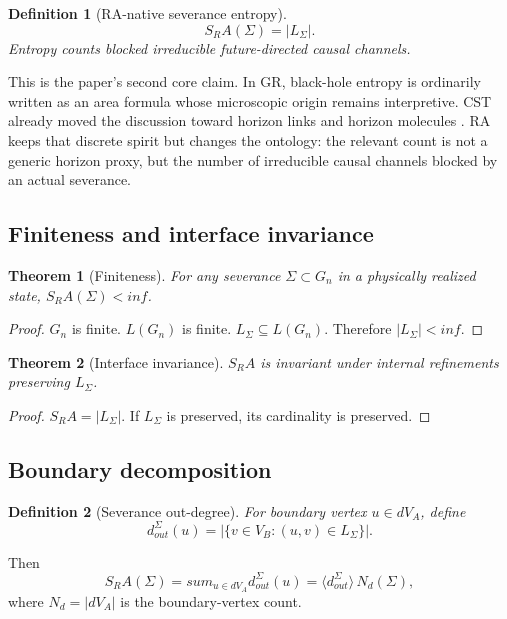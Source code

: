 \documentclass[11pt]{article}
\def\mathrm#1{#1}%
\def\infty{inf}%
\def\sum{sum}%
\def\partial{d}%
\def\SRa{S_RA}%
\newtheorem{definition}{Definition}
\newtheorem{theorem}{Theorem}
\newcommand{\SRa}{\ensuremath{S_{\mathrm{RA}}}}
\begin{document}
\begin{definition}[RA-native severance entropy]
\[
\boxed{\SRa(\Sigma)=|L_\Sigma|.}
\]
Entropy counts blocked irreducible future-directed causal channels.
\end{definition}

This is the paper's second core claim. In GR, black-hole entropy is ordinarily written as an area formula whose microscopic origin remains interpretive. CST already moved the discussion toward horizon links and horizon molecules \cite{Dou2003,Barton2019,Homsak2024}. RA keeps that discrete spirit but changes the ontology: the relevant count is not a generic horizon proxy, but the number of irreducible causal channels blocked by an actual severance.

\subsection{Finiteness and interface invariance}

\begin{theorem}[Finiteness]
For any severance $\Sigma\subset G_n$ in a physically realized state, $\SRa(\Sigma)<\infty$.
\end{theorem}
\begin{proof}
$G_n$ is finite. $L(G_n)$ is finite. $L_\Sigma\subseteq L(G_n)$. Therefore $|L_\Sigma|<\infty$.
\end{proof}

\begin{theorem}[Interface invariance]
$\SRa$ is invariant under internal refinements preserving $L_\Sigma$.
\end{theorem}
\begin{proof}
$\SRa=|L_\Sigma|$. If $L_\Sigma$ is preserved, its cardinality is preserved.
\end{proof}

\subsection{Boundary decomposition}

\begin{definition}[Severance out-degree]
For boundary vertex $u\in\partial V_A$, define
\[
d_{\mathrm{out}}^\Sigma(u)=|\{v\in V_B:(u,v)\in L_\Sigma\}|.
\]
\end{definition}

Then
\begin{equation}
\label{eq:decomposition}
\SRa(\Sigma)=\sum_{u\in\partial V_A}d_{\mathrm{out}}^\Sigma(u)=\langle d_{\mathrm{out}}^\Sigma\rangle\,N_\partial(\Sigma),
\end{equation}
where $N_\partial=|\partial V_A|$ is the boundary-vertex count.
\end{document}
